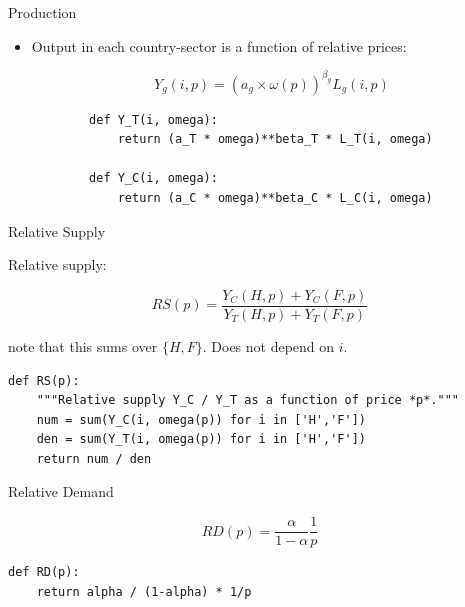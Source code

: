 \documentclass[notes,11pt, aspectratio=169, xcolor=table]{beamer}
\newenvironment{wideitemize}{\itemize\addtolength{\itemsep}{10pt}}{\enditemize}
\begin{document}
\begin{frame}[fragile=singleslide]{Production}

\begin{itemize}
    \item Output in each country-sector is a function of relative prices:

        \begin{equation*}
        \boxed{
            Y_{g}(i,p) =  \left(a_g \times \omega(p) \right)^{\beta_g} L_{g}(i,p)
        }
        \end{equation*}

        \begin{verbatim}
        def Y_T(i, omega):
            return (a_T * omega)**beta_T * L_T(i, omega)
        
        def Y_C(i, omega):
            return (a_C * omega)**beta_C * L_C(i, omega)        
        \end{verbatim}
\end{itemize}
    
\end{frame}


\begin{frame}[fragile=singleslide]{Relative Supply}

\begin{wideitemize}
    
    \item Relative supply:

    \begin{equation*}
    \boxed{
        RS(p) = \frac{Y_{C}(H,p) + Y_{C}(F,p)}{Y_{T}(H,p) + Y_{T}(F,p)}
    }
    \end{equation*}

    note that this sums over $\{ H, F \}$. Does not depend on $i$.
        \begin{verbatim}
def RS(p):
    """Relative supply Y_C / Y_T as a function of price *p*."""
    num = sum(Y_C(i, omega(p)) for i in ['H','F'])
    den = sum(Y_T(i, omega(p)) for i in ['H','F'])
    return num / den
        \end{verbatim}
        
    
\end{wideitemize}

    
\end{frame}


\begin{frame}[fragile=singleslide]{Relative Demand}

\begin{wideitemize}
    
\begin{equation*}
    \boxed{
    RD(p) = \frac{\alpha}{1-\alpha} \frac{1}{p}
    }
\end{equation*}

    \begin{verbatim}
def RD(p):
    return alpha / (1-alpha) * 1/p
    \end{verbatim}

        
    
\end{wideitemize}

    
\end{frame}
\end{document}
